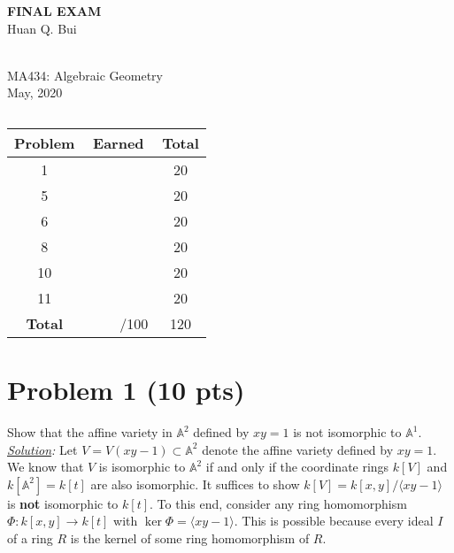 \documentclass[12pt]{article}
\newcommand{\A}{\mathbb{A}}
\begin{document}
\begin{center}
	\LARGE{\textbf{FINAL EXAM}}
	\\
	\large{Huan Q. Bui}
	
	\noindent \hrulefill\\
	\small{MA434: Algebraic Geometry}\\
	\small{May, 2020}\\\vspace{-6pt}
	\hrulefill
\end{center}


$\,$\\
$\,$\\


\begin{center}
\begin{tabular}{|c|c|c|}
	\hline
	Problem & Earned & Total\\
	\hline
	1&&20\\
	\hline
	5&&20\\
	\hline
	6&&20\\
	\hline
	8&&20\\
	\hline
	10&&20\\
	\hline
	11&&20\\
	\hline
	\textbf{Total}&$\,\quad\quad$/100&120\\
	\hline
\end{tabular}
\end{center}

\newpage



%
%
%
%




\section*{Problem 1 \small{(10 pts)}}
Show that the affine variety in $\A^2$ defined by $xy=1$ is not isomorphic to $\A^1$. \\

\noindent \textit{\underline{Solution}:} Let $V=V(xy-1)\subset \A^2$ denote the affine variety defined by $xy=1$. We know that $V$ is isomorphic to $\A^2$ if and only if the coordinate rings $k[V]$ and $k[\A^2] = k[t]$ are also isomorphic. It suffices to show $k[V] = k[x,y]/\langle xy-1\rangle$ is \textbf{not} isomorphic to $k[t]$. To this end, consider any ring homomorphism $\Phi: k[x,y] \to k[t]$ with $\ker\Phi = \langle xy-1\rangle$. This is possible because every ideal $I$ of a ring $R$ is the kernel of some ring homomorphism of $R$.\\
\end{document}

